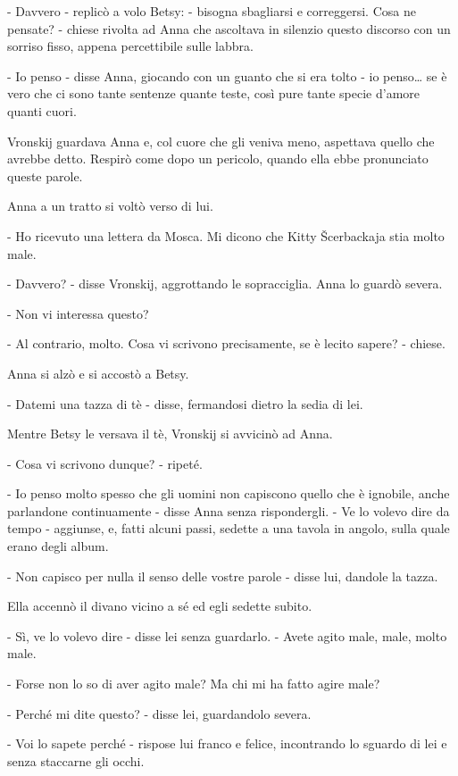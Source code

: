 - Davvero - replicò a volo Betsy: - bisogna sbagliarsi e correggersi. Cosa ne pensate? - chiese rivolta ad Anna che ascoltava in silenzio questo discorso con un sorriso fisso, appena percettibile sulle labbra. 

- Io penso - disse Anna, giocando con un guanto che si era tolto - io penso\ldots{} se è vero che ci sono tante sentenze quante teste, così pure tante specie d'amore quanti cuori. 

Vronskij guardava Anna e, col cuore che gli veniva meno, aspettava quello che avrebbe detto. Respirò come dopo un pericolo, quando ella ebbe pronunciato queste parole. 

Anna a un tratto si voltò verso di lui. 

- Ho ricevuto una lettera da Mosca. Mi dicono che Kitty Šcerbackaja stia molto male. 

- Davvero? - disse Vronskij, aggrottando le sopracciglia. Anna lo guardò severa. 

- Non vi interessa questo? 

- Al contrario, molto. Cosa vi scrivono precisamente, se è lecito sapere? - chiese. 

Anna si alzò e si accostò a Betsy. 

- Datemi una tazza di tè - disse, fermandosi dietro la sedia di lei. 

Mentre Betsy le versava il tè, Vronskij si avvicinò ad Anna. 

- Cosa vi scrivono dunque? - ripeté. 

- Io penso molto spesso che gli uomini non capiscono quello che è ignobile, anche parlandone continuamente - disse Anna senza rispondergli. - Ve lo volevo dire da tempo - aggiunse, e, fatti alcuni passi, sedette a una tavola in angolo, sulla quale erano degli album. 

- Non capisco per nulla il senso delle vostre parole - disse lui, dandole la tazza. 

Ella accennò il divano vicino a sé ed egli sedette subito. 

- Sì, ve lo volevo dire - disse lei senza guardarlo. - Avete agito male, male, molto male. 

- Forse non lo so di aver agito male? Ma chi mi ha fatto agire male? 

- Perché mi dite questo? - disse lei, guardandolo severa. 

- Voi lo sapete perché - rispose lui franco e felice, incontrando lo sguardo di lei e senza staccarne gli occhi. 

